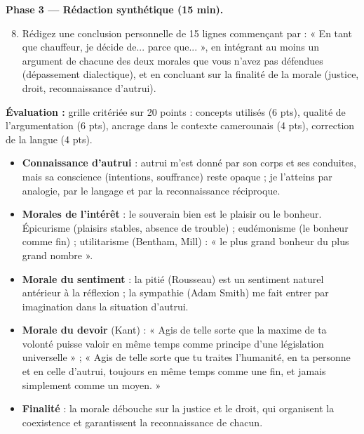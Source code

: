 \documentclass[11pt]{article}
\newcommand{\cle}[1]{{\popxbold\color{popdark}#1}}
\newcounter{popsec}
\newcounter{popsub}
\newcommand{\courssub}[1]{%
  \stepcounter{popsub}%
  \par\vspace{9pt}\noindent{\popxbold\fontsize{11.5}{13}\selectfont\color{popink}{\color{poporange}\thepopsec.\thepopsub}\hspace{6pt}#1}\par\nopagebreak\vspace{4pt}
}
\begin{document}
\textbf{Phase 3 — Rédaction synthétique (15 min).}

\begin{enumerate}
\setcounter{enumi}{7}
\item Rédigez une conclusion personnelle de 15 lignes commençant par : « En tant que chauffeur, je décide de... parce que... », en intégrant au moins un argument de chacune des deux morales que vous n'avez pas défendues (dépassement dialectique), et en concluant sur la finalité de la morale (justice, droit, reconnaissance d'autrui).
\end{enumerate}

\textbf{Évaluation :} grille critériée sur 20 points : concepts utilisés (6 pts), qualité de l'argumentation (6 pts), ancrage dans le contexte camerounais (4 pts), correction de la langue (4 pts).

\courssub{Ressources à mobiliser}

\begin{aretenir}
\begin{itemize}
\item \textbf{Connaissance d'autrui} : autrui m'est donné par son corps et ses conduites, mais sa conscience (intentions, souffrance) reste \cle{opaque} ; je l'atteins par analogie, par le langage et par la \cle{reconnaissance} réciproque.
\item \textbf{Morales de l'intérêt} : le souverain bien est le plaisir ou le bonheur. Épicurisme (plaisirs stables, absence de trouble) ; eudémonisme (le bonheur comme fin) ; utilitarisme (Bentham, Mill) : « le plus grand bonheur du plus grand nombre ».
\item \textbf{Morale du sentiment} : la pitié (Rousseau) est un sentiment naturel antérieur à la réflexion ; la sympathie (Adam Smith) me fait entrer par imagination dans la situation d'autrui.
\item \textbf{Morale du devoir} (Kant) : « Agis de telle sorte que la maxime de ta volonté puisse valoir en même temps comme principe d'une législation universelle » ; « Agis de telle sorte que tu traites l'humanité, en ta personne et en celle d'autrui, toujours en même temps comme une fin, et jamais simplement comme un moyen. »
\item \textbf{Finalité} : la morale débouche sur la justice et le droit, qui organisent la coexistence et garantissent la reconnaissance de chacun.
\end{itemize}
\end{aretenir}
\end{document}
